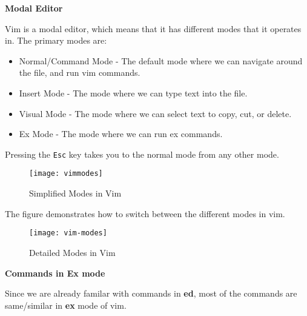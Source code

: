 \textbf{Modal Editor}


Vim is a modal editor, which means that it has different modes
that it operates in. The primary modes are:

\begin{itemize}
  \item Normal/Command Mode - The default mode where we can navigate
    around the file, and run vim commands.
  \item Insert Mode - The mode where we can type text into the file.
  \item Visual Mode - The mode where we can select text to copy, cut, or delete.
  \item Ex Mode - The mode where we can run ex commands.
\end{itemize}

Pressing the \texttt{Esc} key takes you to the normal mode
from any other mode.

\begin{figure}[h!]
  \texttt{[image: vimmodes]}
  \caption{Simplified Modes in Vim}
\end{figure}

The figure  demonstrates how to switch between
the different modes in vim.

\begin{figure*}[h]
  \texttt{[image: vim-modes]}
  \caption{Detailed Modes in Vim}
\end{figure*}

\textbf{Commands in Ex mode}

Since we are already familar with commands in
\textbf{ed}, most of the commands are same/similar
in \textbf{ex} mode of vim.

